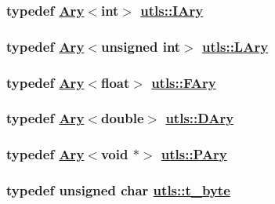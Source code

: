 \hypertarget{namespaceutls_cedb1dc4cf8e712ee80ed835d1657adf}{
\subsubsection[IAry]{\setlength{\rightskip}{0pt plus 5cm}typedef \hyperlink{structutls_1_1Ary}{Ary}$<$int$>$ \hyperlink{structutls_1_1Ary}{utls::IAry}}}
\label{namespaceutls_cedb1dc4cf8e712ee80ed835d1657adf}


\hypertarget{namespaceutls_ba708fd37f65874aeb7d0f58064f38f7}{
\subsubsection[LAry]{\setlength{\rightskip}{0pt plus 5cm}typedef \hyperlink{structutls_1_1Ary}{Ary}$<$unsigned int$>$ \hyperlink{structutls_1_1Ary}{utls::LAry}}}
\label{namespaceutls_ba708fd37f65874aeb7d0f58064f38f7}


\hypertarget{namespaceutls_9861f46a061f0d50e5206260ce344e3b}{
\subsubsection[FAry]{\setlength{\rightskip}{0pt plus 5cm}typedef \hyperlink{structutls_1_1Ary}{Ary}$<$float$>$ \hyperlink{structutls_1_1Ary}{utls::FAry}}}
\label{namespaceutls_9861f46a061f0d50e5206260ce344e3b}


\hypertarget{namespaceutls_7fda688c7bc81c289b7285486f269999}{
\subsubsection[DAry]{\setlength{\rightskip}{0pt plus 5cm}typedef \hyperlink{structutls_1_1Ary}{Ary}$<$double$>$ \hyperlink{structutls_1_1Ary}{utls::DAry}}}
\label{namespaceutls_7fda688c7bc81c289b7285486f269999}


\hypertarget{namespaceutls_4e1d37c1ae35859d94f2abc53c6e32f4}{
\subsubsection[PAry]{\setlength{\rightskip}{0pt plus 5cm}typedef \hyperlink{structutls_1_1Ary}{Ary}$<$void $\ast$$>$ \hyperlink{structutls_1_1Ary}{utls::PAry}}}
\label{namespaceutls_4e1d37c1ae35859d94f2abc53c6e32f4}


\hypertarget{namespaceutls_dc090f96c41011207bfa8d70a498322f}{
\subsubsection[t\_\-byte]{\setlength{\rightskip}{0pt plus 5cm}typedef unsigned char \hyperlink{namespaceutls_dc090f96c41011207bfa8d70a498322f}{utls::t\_\-byte}}}
\label{namespaceutls_dc090f96c41011207bfa8d70a498322f}


